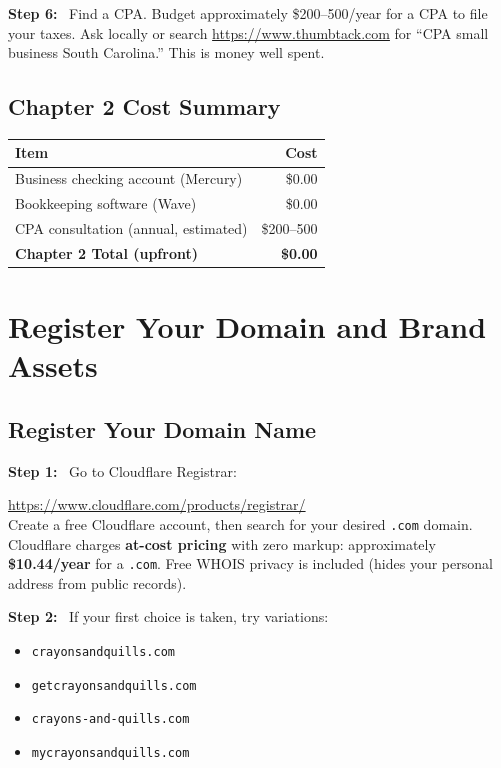 \documentclass[12pt, letterpaper, oneside]{book}
\newcommand{\cost}[1]{\textcolor{money}{\textbf{#1}}}
\newcommand{\step}[1]{\noindent\textbf{\textcolor{primary}{Step #1:}}~}
\begin{document}
\step{6} Find a CPA. Budget approximately \$200--500/year for a CPA to file your taxes. Ask locally or search \url{https://www.thumbtack.com} for ``CPA small business South Carolina.'' This is money well spent.

\section{Chapter 2 Cost Summary}

\begin{table}[H]
\centering
\begin{tabular}{lr}
\toprule
\textbf{Item} & \textbf{Cost} \\
\midrule
Business checking account (Mercury) & \$0.00 \\
Bookkeeping software (Wave) & \$0.00 \\
CPA consultation (annual, estimated) & \$200--500 \\
\midrule
\textbf{Chapter 2 Total (upfront)} & \textbf{\$0.00} \\
\bottomrule
\end{tabular}
\end{table}

\chapter{Register Your Domain and Brand Assets}

\section{Register Your Domain Name}

\step{1} Go to Cloudflare Registrar:
\begin{actionbox}
\url{https://www.cloudflare.com/products/registrar/}\\[4pt]
Create a free Cloudflare account, then search for your desired \texttt{.com} domain.\\
Cloudflare charges \textbf{at-cost pricing} with zero markup: approximately \cost{\$10.44/year} for a \texttt{.com}. Free WHOIS privacy is included (hides your personal address from public records).
\end{actionbox}

\step{2} If your first choice is taken, try variations:
\begin{itemize}[leftmargin=2em]
  \item \texttt{crayonsandquills.com}
  \item \texttt{getcrayonsandquills.com}
  \item \texttt{crayons-and-quills.com}
  \item \texttt{mycrayonsandquills.com}
\end{itemize}
\end{document}
